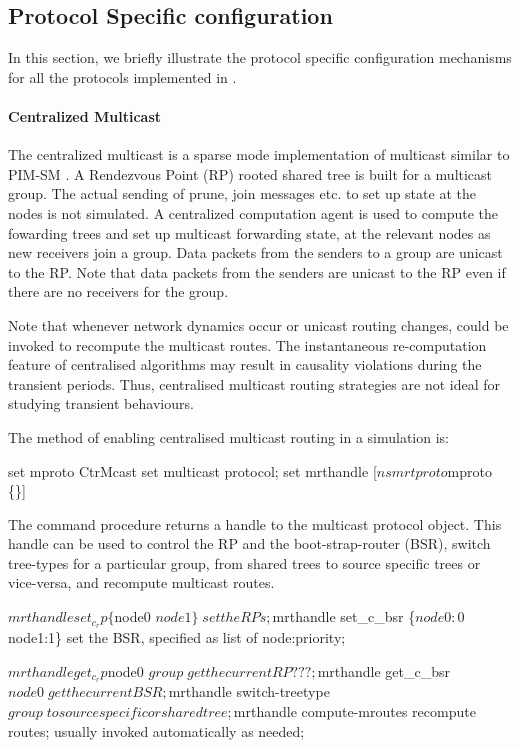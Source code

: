 \subsection{Protocol Specific configuration}

In this section, we briefly illustrate the
protocol specific configuration mechanisms
for all the protocols implemented in \ns.

\paragraph{Centralized Multicast}
The centralized multicast is a sparse mode implementation of multicast
similar to PIM-SM \cite{Deer94a:Architecture}.
A Rendezvous Point (RP) rooted shared tree is built
for a multicast group.  The actual sending of prune, join messages
etc. to set up state at the nodes is not simulated.  A centralized
computation agent is used to compute the fowarding trees and set up
multicast forwarding state,  at the relevant nodes as new
receivers join a group.  Data packets from the senders to a group are
unicast to the RP.  Note that data packets from the senders are
unicast to the RP even if there are no receivers for the group.

Note that whenever network dynamics occur or unicast routing changes,
 could be invoked to recompute the multicast routes.
The instantaneous re-computation feature of centralised algorithms
may result in causality violations during the transient
periods.  Thus, centralised multicast routing strategies are not
ideal for studying transient behaviours.

The method of enabling centralised multicast routing in a simulation is:
\begin{program}
	set mproto CtrMcast    \; set multicast protocol;
	set mrthandle [$ns mrtproto $mproto \{\}]
\end{program}
The command procedure 
returns a handle to the multicast protocol object.
This handle can be used to control the RP and the boot-strap-router (BSR),
switch tree-types for a particular group,
from shared trees to source specific trees or vice-versa, and
recompute multicast routes.
\begin{program}
	$mrthandle set_c_rp \{$node0 $node1\}      \; set the RPs;
	$mrthandle set_c_bsr \{$node0:0 $node1:1\} \; set the BSR, specified as list of node:priority;

	$mrthandle get_c_rp $node0 $group          \; get the current RP ???;
	$mrthandle get_c_bsr $node0                \; get the current BSR;

	$mrthandle switch-treetype $group         \; to source specific or shared tree;

	$mrthandle compute-mroutes       \; recompute routes; usually invoked automatically as needed;
\end{program}

